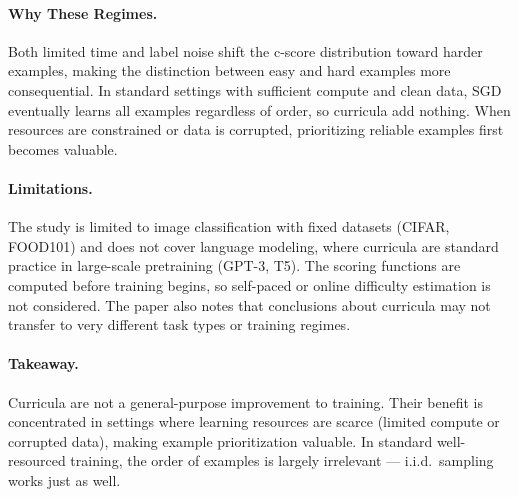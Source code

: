 \documentclass[12pt]{article}
\begin{document}
\paragraph{Why These Regimes.}
Both limited time and label noise shift the c-score distribution toward
harder examples, making the distinction between easy and hard examples more
consequential. In standard settings with sufficient compute and clean data,
SGD eventually learns all examples regardless of order, so curricula add
nothing. When resources are constrained or data is corrupted, prioritizing
reliable examples first becomes valuable.

\paragraph{Limitations.}
The study is limited to image classification with fixed datasets (CIFAR,
FOOD101) and does not cover language modeling, where curricula are standard
practice in large-scale pretraining (GPT-3, T5). The scoring functions are
computed before training begins, so self-paced or online difficulty
estimation is not considered. The paper also notes that conclusions about
curricula may not transfer to very different task types or training regimes.

\paragraph{Takeaway.}
Curricula are not a general-purpose improvement to training. Their benefit
is concentrated in settings where learning resources are scarce (limited
compute or corrupted data), making example prioritization valuable. In
standard well-resourced training, the order of examples is largely
irrelevant --- i.i.d.\ sampling works just as well.
\end{document}
